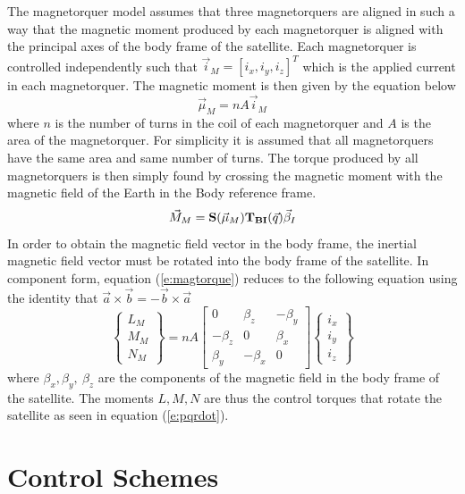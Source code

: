 \documentclass{article}
\begin{document}
The magnetorquer model assumes that three magnetorquers are aligned in
such a way that the magnetic moment produced by each magnetorquer is
aligned with the principal axes of the body frame of the
satellite. Each magnetorquer is controlled independently such that
$\vec{i}_M = [i_x,i_y,i_z]^T$ which is the applied current in each
magnetorquer. The magnetic moment is then given by the equation below 
\begin{equation}\label{e:magmoment}
  \vec{\mu}_M = nA\vec{i}_M
\end{equation}
where $n$ is the number of turns in the coil 
of each magnetorquer and $A$ is the area of the magnetorquer. For
simplicity it is assumed that all magnetorquers have the same area and
same number of turns. The torque produced by all magnetorquers is then
simply found by crossing the magnetic moment with the magnetic field
of the Earth in the Body reference frame.
\begin{equation}\label{e:magtorque}
  \vec{M}_M = {\bf S}(\vec{\mu}_M){\bf T_{BI}}(\vec{q})\vec{\beta}_I
\end{equation}
In order to obtain the magnetic field vector in the body frame, the
inertial magnetic field vector must be rotated into the body frame of
the satellite. In component form, equation (\ref{e:magtorque}) reduces to the following
equation using the identity that $\vec{a}\times\vec{b}=-\vec{b}\times\vec{a}$
\begin{equation}\label{e:magtorquecomponent}
  \begin{Bmatrix} L_M \\ M_M \\ N_M \end{Bmatrix} = nA\begin{bmatrix} 0 & \beta_z & -\beta_y \\ -\beta_z & 0 &
  \beta_x \\ \beta_y & -\beta_x & 0 \end{bmatrix}\begin{Bmatrix} i_{x}
    \\ i_{y} \\ i_{z} \end{Bmatrix}
\end{equation}
where $\beta_x,\beta_y,~\beta_z$ are the components of the magnetic
field in the body frame of the satellite. The moments $L,M,N$ are thus
the control torques that rotate the satellite as seen in equation
(\ref{e:pqrdot}). 

\section{Control Schemes}
\end{document}
